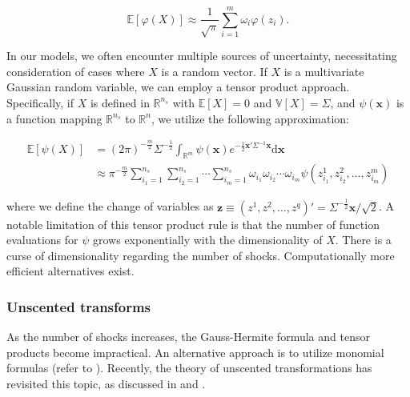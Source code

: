 \documentclass[a4paper,11pt]{amsart}
\begin{document}
\[
   \mathbb{E}[\varphi(X)] \approx \frac{1}{\sqrt{\pi}} \sum_{i=1}^m \omega_i \varphi(z_i).
\]

In our models, we often encounter multiple sources of uncertainty,
necessitating consideration of cases where $X$ is a random
vector. If $X$ is a multivariate Gaussian random variable, we can
employ a tensor product approach. Specifically, if $X$ is defined
in $\mathbb{R}^{n_s}$ with $\mathbb{E}[X] = 0$
and $\mathbb{V}[X] = \Sigma$, and $\psi(\mathbf{x})$ is a function
mapping $\mathbb{R}^{n_s}$ to $\mathbb{R}^n$, we utilize the following
approximation:

\[
   \begin{split}
      \mathbb{E}[\psi(X)] & =(2\pi)^{-\frac{m}{2}} \Sigma^{-\frac{1}{2}} \int_{\mathbb{R}^m} \psi(\mathbf{x}) e^{-\frac{1}{2} \mathbf{x}' \Sigma^{-1} \mathbf{x}} \mathrm{d}\mathbf{x}                             \\
                          & \approx \pi^{-\frac{m}{2}} \sum_{i_1=1}^{n_s} \sum_{i_2=1}^{n_s} \cdots \sum_{i_m=1}^{n_s} \omega_{i_1} \omega_{i_2} \cdots \omega_{i_m} \psi(z_{i_1}^1, z_{i_2}^2, \ldots, z_{i_m}^m)
   \end{split}
\]

where we define the change of variables
as
$\mathbf{z} \equiv (z^1, z^2, \ldots, z^q)' = \Sigma^{-\frac{1}{2}} \mathbf{x} / \sqrt{2}$. A
notable limitation of this tensor product rule is that the number of
function evaluations for $\psi$ grows exponentially with the
dimensionality of $X$. There is a curse of dimensionality regarding
the number of shocks. Computationally more efficient
alternatives exist.\newline


\subsubsection{Unscented transforms}

As the number of shocks increases, the Gauss-Hermite formula and
tensor products become impractical. An alternative approach is to
utilize monomial formulas (refer to \textcite{Stroud1971}). Recently,
the theory of unscented transformations has revisited this topic, as
discussed in \textcite{Julier2000} and \textcite{Julier2002}.\newline
\end{document}
